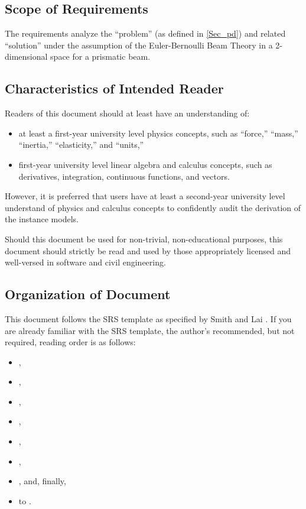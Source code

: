 \documentclass[12pt]{article}
\begin{document}
\subsection{Scope of Requirements} \label{ssec_scope}

The requirements analyze the ``problem'' (as defined in \autoref{Sec_pd}) and
related ``solution'' under the assumption of the Euler-Bernoulli Beam Theory
\cite{EulerBernoulliWiki} in a 2-dimensional space for a prismatic beam.

\subsection{Characteristics of Intended Reader} \label{sec_IntendedReader}

Readers of this document should at least have an understanding of:
\begin{itemize}
    \item at least a first-year university level physics concepts, such as
          ``force,'' ``mass,'' ``inertia,'' ``elasticity,'' and ``units,''
    \item first-year university level linear algebra and calculus concepts, such
          as derivatives, integration, continuous functions, and vectors.
\end{itemize}

However, it is preferred that users have at least a second-year university level
understand of physics and calculus concepts to confidently audit the derivation
of the instance models.

Should this document be used for non-trivial, non-educational purposes, this
document should strictly be read and used by those appropriately licensed and
well-versed in software and civil engineering.

\subsection{Organization of Document}

This document follows the SRS template as specified by Smith and Lai
\cite{SmithAndLai2005}. If you are already familiar with the SRS template, the
author's recommended, but not required, reading order is as follows:

\begin{itemize}
    \item {},
    \item {},
    \item {},
    \item {},
    \item {},
    \item {},
    \item {}, and, finally,
    \item {} to .
\end{itemize}
\end{document}
